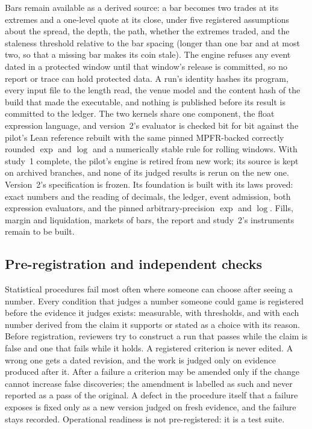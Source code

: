 \documentclass[11pt]{article}
\begin{document}
Bars remain available as a derived source: a bar becomes two trades at its extremes and a one-level quote at its close, under five registered assumptions about the spread, the depth, the path, whether the extremes traded, and the staleness threshold relative to the bar spacing (longer than one bar and at most two, so that a missing bar makes its coin stale). The engine refuses any event dated in a protected window until that window's release is committed, so no report or trace can hold protected data. A run's identity hashes its program, every input file to the length read, the venue model and the content hash of the build that made the executable, and nothing is published before its result is committed to the ledger. The two kernels share one component, the float expression language, and version~2's evaluator is checked bit for bit against the pilot's Lean reference rebuilt with the same pinned MPFR-backed correctly rounded $\exp$ and $\log$ and a numerically stable rule for rolling windows. With study~1 complete, the pilot's engine is retired from new work; its source is kept on archived branches, and none of its judged results is rerun on the new one. Version~2's specification is frozen. Its foundation is built with its laws proved: exact numbers and the reading of decimals, the ledger, event admission, both expression evaluators, and the pinned arbitrary-precision $\exp$ and $\log$. Fills, margin and liquidation, markets of bars, the report and study~2's instruments remain to be built.

\subsection{Pre-registration and independent checks}\label{sec:process}

Statistical procedures fail most often where someone can choose after seeing a number. Every condition that judges a number someone could game is registered before the evidence it judges exists: measurable, with thresholds, and with each number derived from the claim it supports or stated as a choice with its reason. Before registration, reviewers try to construct a run that passes while the claim is false and one that fails while it holds. A registered criterion is never edited. A wrong one gets a dated revision, and the work is judged only on evidence produced after it. After a failure a criterion may be amended only if the change cannot increase false discoveries; the amendment is labelled as such and never reported as a pass of the original. A defect in the procedure itself that a failure exposes is fixed only as a new version judged on fresh evidence, and the failure stays recorded. Operational readiness is not pre-registered: it is a test suite.
\end{document}
